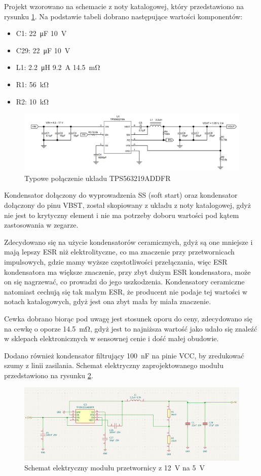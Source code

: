 \documentclass[../../main.tex]{subfiles}
\begin{document}
Projekt wzorowano na schemacie z noty katalogowej, który przedstawiono na rysunku \ref{fig:buck}.
Na podstawie tabeli dobrano następujące wartości komponentów:
\begin{itemize}
    \item C1: \SI{22}{\micro\farad} \SI{10}{\volt}
    \item C29: \SI{22}{\micro\farad} \SI{10}{\volt}
    \item L1: \SI{2.2}{\micro\henry} \SI{9.2}{\ampere} \SI{14.5}{\milli\ohm}
    \item R1: \SI{56}{\kilo\ohm}
    \item R2: \SI{10}{\kilo\ohm}
\end{itemize}

\begin{figure}[H]
    \centering
    \includegraphics[width=1\textwidth]{buck.png}
    \caption{Typowe połączenie układu TPS563219ADDFR \cite{st:buck}}
    \label{fig:buck}
\end{figure}

Kondensator dołączony do wyprowadzenia SS (soft start) oraz kondensator dołączony do pinu VBST, został skopiowany z układu z noty katalogowej, gdyż nie jest to krytyczny element i nie ma potrzeby doboru wartości pod 
kątem zastosowania w zegarze.

Zdecydowano się na użycie kondensatorów ceramicznych, gdyż są one mniejsze i mają lepszy ESR niż elektrolityczne, co ma znaczenie przy przetwornicach impulsowych,
gdzie mamy wyższe częstotliwości przełączania, więc ESR kondensatora ma większe znaczenie, przy zbyt dużym ESR kondensatora, może on się nagrzewać, co prowadzi do jego uszkodzenia.
Kondensatory ceramiczne natomiast cechują się tak małym ESR, że producent nie podaje tej wartości w notach katalogowych, gdyż jest ona zbyt mała by miała znaczenie.

Cewka dobrano biorąc pod uwagę jest stosunek oporu do ceny, zdecydowano się na cewkę o oporze \SI{14.5}{\milli\ohm}, 
gdyż jest to najniższa wartość jako udało się znaleźć w sklepach elektronicznych w sensownej cenie i dość małej obudowie.

Dodano również kondensator filtrujący \SI{100}{\nano\farad} na pinie VCC, by zredukować szumy z linii zasilania.
Schemat elektryczny zaprojektowanego modułu przedstawiono na rysunku \ref{fig:buck-schemat}.

\begin{figure}[H]
    \centering
    \includegraphics[width=1\textwidth]{5vTo12V_ schemat.png}
    \caption{Schemat elektryczny modułu przetwornicy z \SI{12}{\volt} na \SI{5}{\volt}}
    \label{fig:buck-schemat}
\end{figure}
\end{document}
